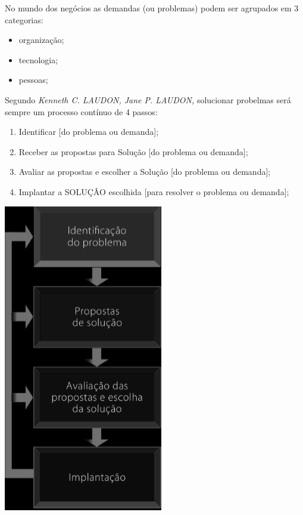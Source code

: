 \documentclass[
]{book}
\begin{document}
No mundo dos negócios as demandas (ou problemas) podem ser agrupados em 3 categorias:

\begin{itemize}
\item
  organização;
\item
  tecnologia;
\item
  pessoas;
\end{itemize}

Segundo \emph{Kenneth C. LAUDON, Jane P. LAUDON,} solucionar probelmas será sempre um processo contínuo de 4 passos:

\begin{enumerate}
\def\labelenumi{\arabic{enumi}.}
\item
  Identificar {[}do problema ou demanda{]};
\item
  Receber as propostas para Solução {[}do problema ou demanda{]};
\item
  Avaliar as propostas e escolher a Solução {[}do problema ou demanda{]};
\item
  Implantar a SOLUÇÂO escolhida {[}para resolver o problema ou demanda{]};
\end{enumerate}

\includegraphics{images/clipboard-3657052893.png}
\end{document}
